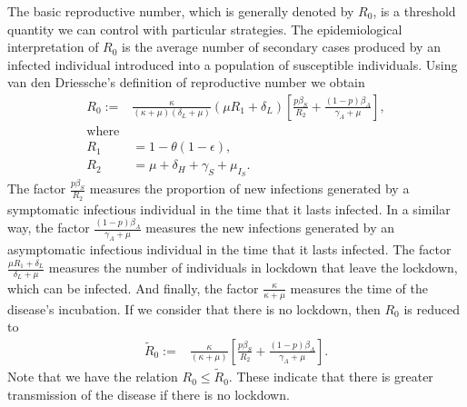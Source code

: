%
The basic reproductive number, which is generally denoted by $ R_0 $,
is a threshold quantity  we can  
 control with particular strategies. The epidemiological interpretation of 
$ R_0 $ is the average number of secondary cases produced by an infected
individual introduced into a population of susceptible individuals.
Using van den Driessche's \cite{VandenDriessche2017a} definition of reproductive number
we obtain
\begin{equation*}
    \label{eqn:reproductive_number}
    \begin{aligned}
        R_0 :=
        &
        \frac{\kappa}{(\kappa + \mu)(\delta_L + \mu)}
        \left(
            \mu R_1 + \delta_L
        \right)
        \left[
            \frac{p\beta_S}{R_2}
            +\frac{(1 - p) \beta_A}{\gamma_A+\mu}
        \right],
    \\
    \text{where} &
    \\
        R_1 &= 1 - \theta(1 - \epsilon),
    \\
        R_2 &= \mu + \delta_H + \gamma_S + \mu_{I_{S}}.
    \end{aligned}
\end{equation*}
%
The factor $\frac{p\beta_S}{R_2}$ measures the proportion of new infections
generated by a symptomatic infectious individual in the time that it lasts
infected. In a similar way, the factor $\frac{(1 - p) \beta_A}{\gamma_A+\mu}$
measures the new infections generated by an asymptomatic infectious individual
in the time that it lasts infected. The factor 
$\frac{\mu R_1 + \delta_L}{\delta_L + \mu}$ measures the number
of individuals in lockdown that leave the lockdown, which can be infected.
And finally, the factor $\frac{\kappa}{\kappa + \mu}$ measures
the time of the disease's incubation.
%
If we consider that there is no lockdown, then $ R_0 $ is reduced to
\begin{equation*}
    \label{eqn:reproductive_number_tilde}
    \begin{aligned}
        \tilde{R}_0 :=
        &
        \frac{\kappa}{(\kappa + \mu)}
        \left[
            \frac{p\beta_S}{R_2}
            +\frac{(1 - p) \beta_A}{\gamma_A+\mu}
        \right].
    \end{aligned}
\end{equation*}
%
Note that we have the relation $ R_0 \leq \tilde{R}_0 $. These indicate that there is greater transmission of the disease if there is no lockdown.

